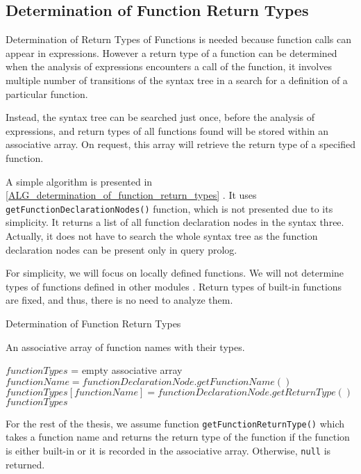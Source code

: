 \subsection{Determination of Function Return Types}
Determination of Return Types of Functions is needed because function calls can appear in expressions. However a return type of a function can be determined when the analysis of expressions encounters a call of the function, it involves multiple number of transitions of the syntax tree in a search for a definition of a particular function.

Instead, the syntax tree can be searched just once, before the analysis of expressions, and return types of all functions found will be stored within an associative array. On request, this array will retrieve the return type of a specified function.

A simple algorithm is presented in \ref{ALG_determination_of_function_return_types} . It uses \texttt{getFunctionDeclarationNodes()} function, which is not presented due to its simplicity. It returns a list of all function declaration nodes in the syntax three. Actually, it does not have to search the whole syntax tree as the function declaration nodes can be present only in query prolog. 

For simplicity, we will focus on locally defined functions. We will not determine types of functions defined in other modules . Return types of built-in functions are fixed, and thus, there is no need to analyze them.

\begin{algorithm}
\caption{Determination of Function Return Types}
\label{ALG_determination_of_function_return_types}
\begin{algorithmic}[1]
\ENSURE An associative array of function names with their types.

\STATE $functionTypes$ = empty associative array
    \STATE $functionName = functionDeclarationNode.getFunctionName()$
    \STATE $functionTypes[functionName] = functionDeclarationNode.getReturnType()$
\ENDFOR
\RETURN $functionTypes$
\end{algorithmic}
\end{algorithm}

For the rest of the thesis, we assume function \texttt{getFunctionReturnType()} which takes a function name and returns the return type of the function if the function is either built-in or it is recorded in the associative array. Otherwise, \texttt{null} is returned.

